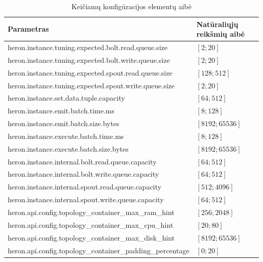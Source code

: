 \documentclass{VUMIFPSbakalaurinis}
\begin{document}
\begin{longtable}{|p{0.59\linewidth}|p{0.4\linewidth}|}
    \caption{Keičiamų konfigūracijos elementų aibė}
    \label{param–table–pract}\\
    \hline
    \rowcolor[HTML]{C0C0C0} 
    Parametras     & Natūraliųjų reikšmių aibė       \\ \hline
    \endfirsthead
    \endhead
    heron.instance.tuning.expected.bolt.read.queue.size       & \([2;20]\) \\ \hline
    heron.instance.tuning.expected.bolt.write.queue.size      & \([2;20]\) \\ \hline
    heron.instance.tuning.expected.spout.read.queue.size      & \([128;512]\) \\ \hline
    heron.instance.tuning.expected.spout.write.queue.size     & \([2;20]\) \\ \hline
    heron.instance.set.data.tuple.capacity                    & \([64;512]\) \\ \hline
    heron.instance.emit.batch.time.ms                         & \([8;128]\) \\ \hline
    heron.instance.emit.batch.size.bytes                      & \([8192;65536]\) \\ \hline
    heron.instance.execute.batch.time.ms                      & \([8;128]\) \\ \hline
    heron.instance.execute.batch.size.bytes                   & \([8192;65536]\) \\ \hline
    heron.instance.internal.bolt.read.queue.capacity          & \([64;512]\) \\ \hline
    heron.instance.internal.bolt.write.queue.capacity         & \([64;512]\) \\ \hline
    heron.instance.internal.spout.read.queue.capacity         & \([512;4096]\) \\ \hline
    heron.instance.internal.spout.write.queue.capacity        & \([64;512]\) \\ \hline
    heron.api.config.topology\_container\_max\_ram\_hint      & \([256;2048]\) \\ \hline
    heron.api.config.topology\_container\_max\_cpu\_hint      & \([20;80]\) \\ \hline
    heron.api.config.topology\_container\_max\_disk\_hint     & \([8192;65536]\) \\ \hline
    heron.api.config.topology\_container\_padding\_percentage & \([0;20]\) \\ \hline
\end{longtable}
\end{document}
